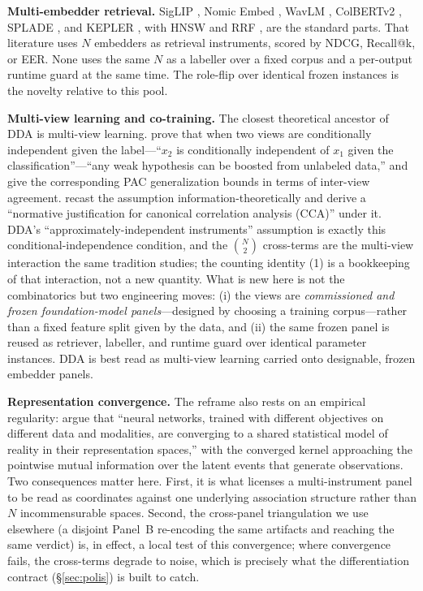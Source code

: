 \documentclass[10pt,twocolumn]{article}
\begin{document}
\textbf{Multi-embedder retrieval.} SigLIP \citep{zhai2023siglip}, Nomic Embed
\citep{nussbaum2024nomic}, WavLM \citep{chen2022wavlm}, ColBERTv2
\citep{santhanam2022colbertv2}, SPLADE \citep{formal2021splade}, and KEPLER
\citep{wang2021kepler}, with HNSW \citep{malkov2018hnsw} and RRF
\citep{cormack2009rrf}, are the standard parts. That literature uses $N$ embedders
as retrieval instruments, scored by NDCG, Recall@k, or EER. None uses the same
$N$ as a labeller over a fixed corpus and a per-output runtime guard at the same
time. The role-flip over identical frozen instances is the novelty relative to
this pool.

\textbf{Multi-view learning and co-training.} The closest theoretical ancestor
of DDA is multi-view learning. \citet{blum1998cotraining} prove that when two
views are conditionally independent given the label---``$x_2$ is conditionally
independent of $x_1$ given the classification''---``any weak hypothesis can be
boosted from unlabeled data,'' and \citet{dasgupta2001pac} give the
corresponding PAC generalization bounds in terms of inter-view agreement.
\citet{sridharan2008multiview} recast the assumption information-theoretically
and derive a ``normative justification for canonical correlation analysis (CCA)''
under it. DDA's ``approximately-independent instruments'' assumption is exactly
this conditional-independence condition, and the $\binom{N}{2}$ cross-terms are
the multi-view interaction the same tradition studies; the counting identity (1)
is a bookkeeping of that interaction, not a new quantity. What is new here is not
the combinatorics but two engineering moves: (i) the views are
\emph{commissioned and frozen foundation-model panels}---designed by choosing a
training corpus---rather than a fixed feature split given by the data, and
(ii) the same frozen panel is reused as retriever, labeller, and runtime guard
over identical parameter instances. DDA is best read as multi-view learning
carried onto designable, frozen embedder panels.

\textbf{Representation convergence.} The reframe also rests on an empirical
regularity: \citet{huh2024platonic} argue that ``neural networks, trained with
different objectives on different data and modalities, are converging to a shared
statistical model of reality in their representation spaces,'' with the converged
kernel approaching the pointwise mutual information over the latent events that
generate observations. Two consequences matter here. First, it is what licenses a
multi-instrument panel to be read as coordinates against one underlying
association structure rather than $N$ incommensurable spaces. Second, the
cross-panel triangulation we use elsewhere (a disjoint Panel~B re-encoding the
same artifacts and reaching the same verdict) is, in effect, a local test of this
convergence; where convergence fails, the cross-terms degrade to noise, which is
precisely what the differentiation contract (\S\ref{sec:polis}) is built to
catch.
\end{document}
